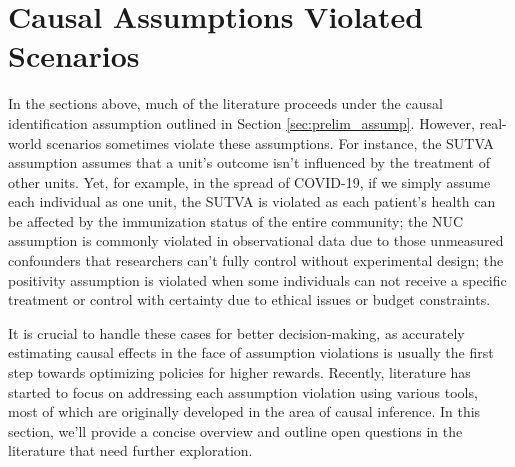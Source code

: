 
\section{Causal Assumptions Violated Scenarios}\label{sec:assump_violated}
In the sections above, much of the literature proceeds under the causal identification assumption outlined in Section \ref{sec:prelim_assump}. However, real-world scenarios sometimes violate these assumptions. 
For instance, the \acrshort{SUTVA} assumption assumes that a unit's outcome isn't influenced by the treatment of other units. 
Yet, for example, in the spread of COVID-19, if we simply assume each individual as one unit, the \acrshort{SUTVA} is violated as each patient's health can be affected by the immunization status of the entire community; 
the \acrshort{NUC} assumption is commonly violated in observational data due to those unmeasured confounders that researchers can't fully control without experimental design; 
the positivity assumption is violated when some individuals can not receive a specific treatment or control with certainty due to ethical issues or budget constraints. 

It is crucial to handle these cases for better decision-making, as accurately estimating causal effects in the face of assumption violations is usually the first step towards optimizing policies for higher rewards. Recently, literature has started to focus on addressing each assumption violation using various tools, most of which are originally developed in the area of causal inference. In this section, we'll provide a concise overview and outline open questions in the literature that need further exploration.

